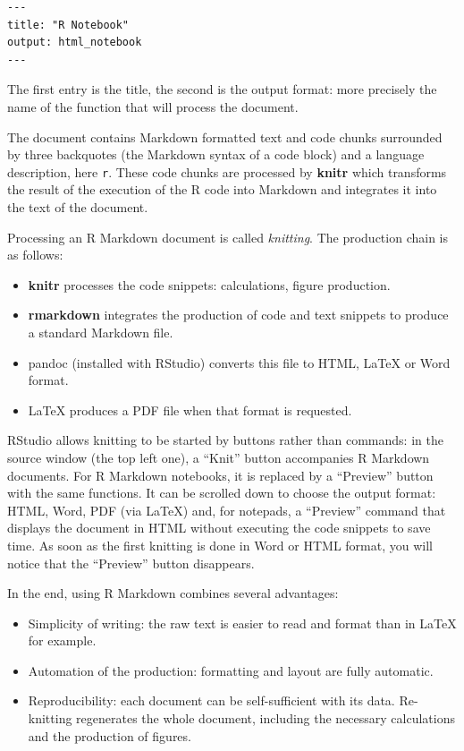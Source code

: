 \documentclass[
  12pt,
  american,
  a4paper,
  extrafontsizes,onecolumn,openright
  ]{memoir}
\providecommand{\tightlist}{%
  \setlength{\itemsep}{0pt}\setlength{\parskip}{0pt}}
\begin{document}
\begin{verbatim}
---
title: "R Notebook"
output: html_notebook
---
\end{verbatim}

The first entry is the title, the second is the output format: more precisely the name of the function that will process the document.

The document contains Markdown formatted text and code chunks surrounded by three backquotes (the Markdown syntax of a code block) and a language description, here \texttt{r}.
These code chunks are processed by \textbf{knitr} which transforms the result of the execution of the R code into Markdown and integrates it into the text of the document.

Processing an R Markdown document is called \emph{knitting}.
The production chain is as follows:

\begin{itemize}
\tightlist
\item
  \textbf{knitr} processes the code snippets: calculations, figure production.
\item
  \textbf{rmarkdown} integrates the production of code and text snippets to produce a standard Markdown file.
\item
  pandoc (installed with RStudio) converts this file to HTML, LaTeX or Word format.
\item
  LaTeX produces a PDF file when that format is requested.
\end{itemize}

RStudio allows knitting to be started by buttons rather than commands: in the source window (the top left one), a \enquote{Knit} button accompanies R Markdown documents.
For R Markdown notebooks, it is replaced by a \enquote{Preview} button with the same functions.
It can be scrolled down to choose the output format: HTML, Word, PDF (via LaTeX) and, for notepads, a \enquote{Preview} command that displays the document in HTML without executing the code snippets to save time.
As soon as the first knitting is done in Word or HTML format, you will notice that the \enquote{Preview} button disappears.

In the end, using R Markdown combines several advantages:

\begin{itemize}
\tightlist
\item
  Simplicity of writing: the raw text is easier to read and format than in LaTeX for example.
\item
  Automation of the production: formatting and layout are fully automatic.
\item
  Reproducibility: each document can be self-sufficient with its data. Re-knitting regenerates the whole document, including the necessary calculations and the production of figures.
\end{itemize}
\end{document}
